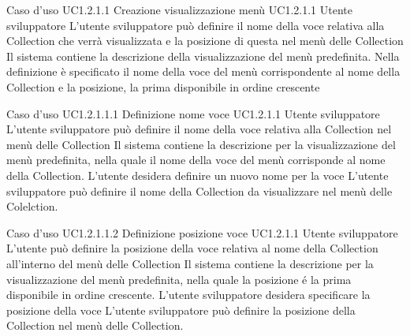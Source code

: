 \UCtitle
{Caso d'uso UC1.2.1.1}
{Creazione visualizzazione menù}
\UC
{UC1.2.1.1}
{Utente sviluppatore}
{L'utente sviluppatore può definire il nome della voce relativa alla Collection che verrà visualizzata e la posizione di questa nel menù delle Collection}
{Il sistema contiene la descrizione della visualizzazione del menù predefinita. Nella definizione è specificato il nome della voce del menù corrispondente al nome della Collection e la posizione, la prima disponibile in ordine crescente}

\UCtitle
{Caso d'uso UC1.2.1.1.1}
{Definizione nome voce}
\UC
{UC1.2.1.1}
{Utente sviluppatore}
{L'utente sviluppatore può definire il nome della voce relativa alla Collection nel menù delle Collection}
{Il sistema contiene la descrizione per la visualizzazione del menù predefinita, nella quale il nome della voce del menù corrisponde al nome della Collection. L'utente desidera definire un nuovo nome per la voce}
\scenario
{L'utente sviluppatore può definire il nome della Collection da visualizzare nel menù delle Colelction.}

\UCtitle
{Caso d'uso UC1.2.1.1.2}
{Definizione posizione voce}
\UC
{UC1.2.1.1}
{Utente sviluppatore}
{L'utente può definire la posizione della voce relativa al nome della Collection all'interno del menù delle Collection}
{Il sistema contiene la descrizione per la visualizzazione del menù predefinita, nella quale la posizione \'e la prima disponibile in ordine crescente. L'utente sviluppatore desidera specificare la posizione della voce}
\scenario
{L'utente sviluppatore può definire la posizione della Collection nel menù delle Collection.}



